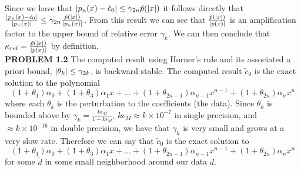 \documentclass[12pt]{article}
\DeclarePairedDelimiter \abs{\lvert}{\rvert}%
\theoremstyle{remark}
\begin{document}
Since we have that $\abs{p_n(x) - \tilde{c}_0} \leq \gamma_{2n}\tilde{p}(\abs{x})$ it follows directly that $\frac{\abs{p_n(x) - \tilde{c}_0}}{\abs{p_n(x)}} \leq \gamma_{2n}\frac{\tilde{p}(\abs{x})}{\abs{p_n(x)}}$. From this result we can see that $\frac{\tilde{p}(\abs{x})}{\abs{p(x)}}$ is an amplification factor to the upper bound of relative error $\gamma_k$. We can then conclude that $\kappa_{rel} = \frac{\tilde{p}(\abs{x})}{\abs{p(x)}}$ by definition. \\

\textbf{PROBLEM 1.2} The computed result using Horner's rule and its associated a priori bound, $\abs{\theta_k} \leq \gamma_{2k}$, is backward stable. The computed result $\tilde{c}_0$ is the exact solution to the polynomial 
$$(1 + \theta_1)\alpha_0 + (1 + \theta_3)\alpha_1x + \ldots + (1 + \theta_{2n-1})\alpha_{n-1}x^{n-1} + (1 + \theta_{2n})\alpha_{n}x^n$$ 
where each $\theta_k$ is the perturbation to the coefficients (the data). Since $\theta_k$ is bounded above by $\gamma_k = \frac{k\epsilon_M}{1-k\epsilon_M}$, $k\epsilon_M \approx k\times10^{-7}$ in single precision, and $\approx k\times10^{-16}$ in double precision, we have that $\gamma_k$ is very small and grows at a very slow rate. Therefore we can say that $\tilde{c}_0$ is the exact solution to 
$$(1 + \theta_1)\alpha_0 + (1 + \theta_3)\alpha_1x + \ldots + (1 + \theta_{2n-1})\alpha_{n-1}x^{n-1} + (1 + \theta_{2n})\alpha_{n}x^n$$
for some $\tilde{d}$ in some small neighborhood around our data $d$. \\
\end{document}
